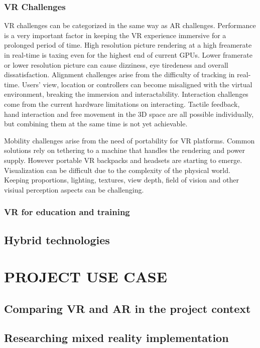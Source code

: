 \documentclass[12pt, a4paper,oneside, nocenter]{thesis}
\begin{document}
\subsection{VR Challenges}
VR challenges can be categorized in the same way as AR challenges.
Performance is a very important factor in keeping the VR experience immersive for a prolonged period of time.
High resolution picture rendering at a high freamerate in real-time is taxing even for the highest end of current GPUs. 
Lower framerate or lower resolution picture can cause dizziness, eye tiredeness and overall dissatisfaction. Alignment challenges arise from the difficulty of tracking in real-time.
Users' view, location or controllers can become misaligned with the virtual environment, breaking the immersion and interactability.
Interaction challenges come from the current hardware limitations on interacting. Tactile feedback, hand interaction and free movement in the 3D space are all possible individually, but combining them at the same time is not yet achievable.
\par
Mobility challenges arise from the need of portability for VR platforms. Common solutions
rely on tethering to a machine that handles the rendering and power supply. However portable VR backpacks and headsets are starting to emerge\citep{hp-vrbackpack}.
Visualization can be difficult due to the complexity of the physical world. Keeping proportions, lighting, textures, view depth, field of vision and other visiual perception aspects can be challenging.
 



\par

\subsection{VR for education and training}
\section{Hybrid technologies}
\par
\chapter{\MakeUppercase{Project use case}}
\section{Comparing VR and AR in the project context}
\section{Researching mixed reality implementation}
\end{document}

